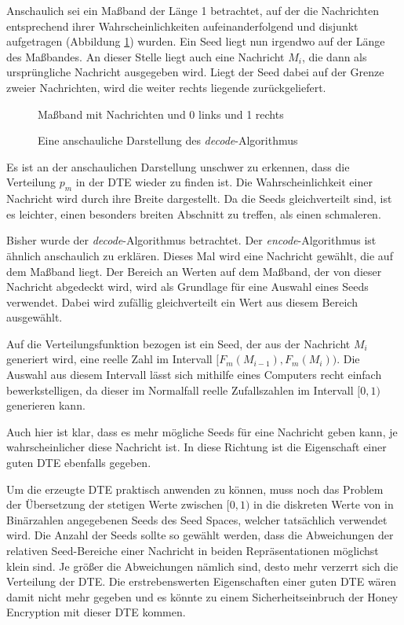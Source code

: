 Anschaulich sei ein Maßband der Länge 1 betrachtet, auf der die Nachrichten entsprechend ihrer Wahrscheinlichkeiten aufeinanderfolgend und disjunkt aufgetragen (Abbildung \ref{fig:decode}) wurden. Ein Seed liegt nun irgendwo auf der Länge des Maßbandes. An dieser Stelle liegt auch eine Nachricht $M_i$, die dann als ursprüngliche Nachricht ausgegeben wird. Liegt der Seed dabei auf der Grenze zweier Nachrichten, wird die weiter rechts liegende zurückgeliefert.

\begin{figure}[!h]
Maßband mit Nachrichten und 0 links und 1 rechts
\caption{Eine anschauliche Darstellung des \emph{decode}-Algorithmus}
\label{fig:decode}
\end{figure}

Es ist an der anschaulichen Darstellung unschwer zu erkennen, dass die Verteilung $p_m$ in der DTE wieder zu finden ist. Die Wahrscheinlichkeit einer Nachricht wird durch ihre Breite dargestellt. Da die Seeds gleichverteilt sind, ist es leichter, einen besonders breiten Abschnitt zu treffen, als einen schmaleren.

Bisher wurde der \emph{decode}-Algorithmus betrachtet. Der \emph{encode}-Algorithmus ist ähnlich anschaulich zu erklären. Dieses Mal wird eine Nachricht gewählt, die auf dem Maßband liegt. Der Bereich an Werten auf dem Maßband, der von dieser Nachricht abgedeckt wird, wird als Grundlage für eine Auswahl eines Seeds verwendet. Dabei wird zufällig gleichverteilt ein Wert aus diesem Bereich ausgewählt.

Auf die Verteilungsfunktion bezogen ist ein Seed, der aus der Nachricht $M_i$ generiert wird, eine reelle Zahl im Intervall $[F_m(M_{i-1}), F_m(M_i))$. Die Auswahl aus diesem Intervall lässt sich mithilfe eines Computers recht einfach bewerkstelligen, da dieser im Normalfall reelle Zufallszahlen im Intervall $[0,1)$ generieren kann.

Auch hier ist klar, dass es mehr mögliche Seeds für eine Nachricht geben kann, je wahrscheinlicher diese Nachricht ist. In diese Richtung ist die Eigenschaft einer guten DTE ebenfalls gegeben.

Um die erzeugte DTE praktisch anwenden zu können, muss noch das Problem der Übersetzung der stetigen Werte zwischen $[0,1)$ in die diskreten Werte von in Binärzahlen angegebenen Seeds des Seed Spaces, welcher tatsächlich verwendet wird. Die Anzahl der Seeds sollte so gewählt werden, dass die Abweichungen der relativen Seed-Bereiche einer Nachricht in beiden Repräsentationen möglichst klein sind. Je größer die Abweichungen nämlich sind, desto mehr verzerrt sich die Verteilung der DTE. Die erstrebenswerten Eigenschaften einer guten DTE wären damit nicht mehr gegeben und es könnte zu einem Sicherheitseinbruch der Honey Encryption mit dieser DTE kommen.

\newpage